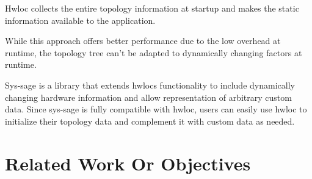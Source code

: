 Hwloc collects the entire topology information at startup and makes the static information available to the application. \cite{hwloc_paper}

While this approach offers better performance due to the low overhead at runtime, the topology tree can't be adapted to dynamically changing factors at runtime.

Sys-sage \cite{sys-sage} is a library that extends hwlocs functionality to include dynamically changing hardware information and allow representation of arbitrary custom data.
Since sys-sage is fully compatible with hwloc, users can easily use hwloc to initialize their topology data and complement it with custom data as needed.

\section{Related Work Or Objectives}
